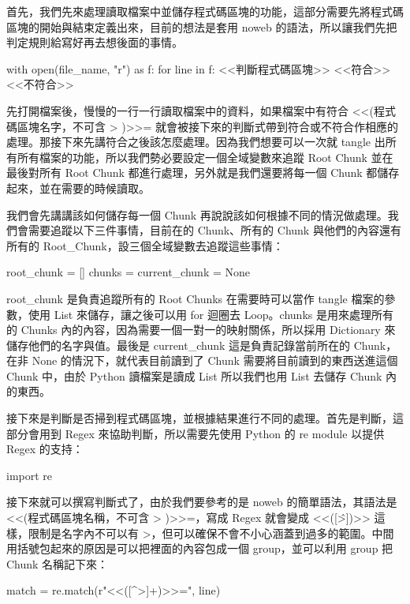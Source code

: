 \documentclass[12pt, a4paper]{NGPLB}
\begin{document}
首先，我們先來處理讀取檔案中並儲存程式碼區塊的功能，這部分需要先將程式碼區塊的開始與結束定義出來，目前的想法是套用 noweb 的語法，所以讓我們先把判定規則給寫好再去想後面的事情。


\begin{mylisting}
with open(file_name, "r") as f:
	for line in f:
		<<判斷程式碼區塊>>
		<<符合>>
		<<不符合>>
\end{mylisting}


先打開檔案後，慢慢的一行一行讀取檔案中的資料，如果檔案中有符合 <<(程式碼區塊名字，不可含 > )>>= 就會被接下來的判斷式帶到符合或不符合作相應的處理。那接下來先講符合之後該怎麼處理。因為我們想要可以一次就 tangle 出所有所有檔案的功能，所以我們勢必要設定一個全域變數來追蹤 Root Chunk 並在最後對所有 Root Chunk 都進行處理，另外就是我們還要將每一個 Chunk 都儲存起來，並在需要的時候讀取。

我們會先講講該如何儲存每一個 Chunk 再說說該如何根據不同的情況做處理。我們會需要追蹤以下三件事情，目前在的 Chunk、所有的 Chunk 與他們的內容還有所有的 Root\_Chunk，設三個全域變數去追蹤這些事情：


\begin{mylisting}
root_chunk = []
chunks = {}
current_chunk = None
\end{mylisting}


root\_chunk 是負責追蹤所有的 Root Chunks 在需要時可以當作 tangle 檔案的參數，使用 List 來儲存，讓之後可以用 for 迴圈去 Loop。chunks 是用來處理所有的 Chunks 內的內容，因為需要一個一對一的映射關係，所以採用 Dictionary 來儲存他們的名字與值。最後是 current\_chunk 這是負責記錄當前所在的 Chunk，在非 None 的情況下，就代表目前讀到了 Chunk 需要將目前讀到的東西送進這個 Chunk 中，由於 Python 讀檔案是讀成 List 所以我們也用 List 去儲存 Chunk 內的東西。

接下來是判斷是否掃到程式碼區塊，並根據結果進行不同的處理。首先是判斷，這部分會用到 Regex 來協助判斷，所以需要先使用 Python 的 re module 以提供 Regex 的支持：


\begin{mylisting}
import re
\end{mylisting}


接下來就可以撰寫判斷式了，由於我們要參考的是 noweb 的簡單語法，其語法是 <<(程式碼區塊名稱，不可含 > )>>=，寫成 Regex 就會變成 <<([\^>])>> 這樣，限制是名字內不可以有 >，但可以確保不會不小心涵蓋到過多的範圍。中間用括號包起來的原因是可以把裡面的內容包成一個 group，並可以利用 group 把 Chunk 名稱記下來：


\begin{mylisting}
match = re.match(r"<<([^>]+)>>=", line)
\end{mylisting}
\end{document}
